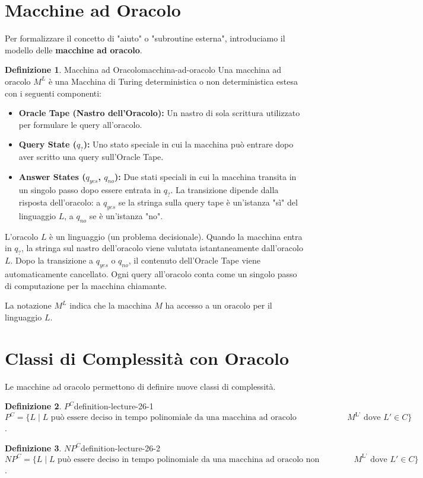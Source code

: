 \documentclass[a4paper]{article}
\theoremstyle{definition} %
\newtheorem{definition}{Definizione}
\begin{document}
\section{Macchine ad Oracolo}
Per formalizzare il concetto di "aiuto" o "subroutine esterna", introduciamo il modello delle \textbf{macchine ad oracolo}.

\begin{definition}{Macchina ad Oracolo}{macchina-ad-oracolo}
Una macchina ad oracolo $M^L$ è una Macchina di Turing deterministica o non deterministica estesa con i seguenti componenti:
\begin{itemize}
    \item \textbf{Oracle Tape (Nastro dell'Oracolo):} Un nastro di sola scrittura utilizzato per formulare le query all'oracolo.
    \item \textbf{Query State ($q_?$):} Uno stato speciale in cui la macchina può entrare dopo aver scritto una query sull'Oracle Tape.
    \item \textbf{Answer States ($q_{yes}$, $q_{no}$):} Due stati speciali in cui la macchina transita in un singolo passo dopo essere entrata in $q_?$. La transizione dipende dalla risposta dell'oracolo: a $q_{yes}$ se la stringa sulla query tape è un'istanza "sì" del linguaggio $L$, a $q_{no}$ se è un'istanza "no".
\end{itemize}
L'oracolo $L$ è un linguaggio (un problema decisionale). Quando la macchina entra in $q_?$, la stringa sul nastro dell'oracolo viene valutata istantaneamente dall'oracolo $L$. Dopo la transizione a $q_{yes}$ o $q_{no}$, il contenuto dell'Oracle Tape viene automaticamente cancellato. Ogni query all'oracolo conta come un singolo passo di computazione per la macchina chiamante.
\end{definition}
La notazione $M^L$ indica che la macchina $M$ ha accesso a un oracolo per il linguaggio $L$.

\section{Classi di Complessità con Oracolo}
Le macchine ad oracolo permettono di definire nuove classi di complessità.
\begin{definition}{$P^C$}{definition-lecture-26-1}
$P^C = \{ L \mid L \text{ può essere deciso in tempo polinomiale da una macchina ad oracolo deterministica } M^{\text{L'}} \text{ dove } L' \in C \}$.
\end{definition}
\begin{definition}{$NP^C$}{definition-lecture-26-2}
$NP^C = \{ L \mid L \text{ può essere deciso in tempo polinomiale da una macchina ad oracolo non deterministica } M^{\text{L'}} \text{ dove } L' \in C \}$.
\end{definition}
\end{document}
